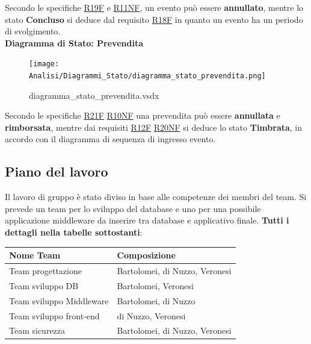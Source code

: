 \documentclass[a4paper]{article}
\begin{document}
Secondo le specifiche \hyperlink{R19F}{R19F} e \hyperlink{R11NF}{R11NF}, un evento può essere \textbf{annullato}, mentre lo stato \textbf{Concluso} si deduce dal requisito \hyperlink{R18F}{R18F} in quanto un evento ha un periodo di svolgimento.\\

\textbf{Diagramma di Stato: Prevendita}

\begin{figure}[H]
    \texttt{[image: Analisi/Diagrammi\_Stato/diagramma\_stato\_prevendita.png]}
    \centering
    \caption{diagramma\_stato\_prevendita.vsdx}
\end{figure}

Secondo le specifiche \hyperlink{R21F}{R21F} \hyperlink{R10NF}{R10NF} una prevendita può essere \textbf{annullata} e \textbf{rimborsata}, mentre dai requisiti \hyperlink{R12F}{R12F} \hyperlink{R20NF}{R20NF} si deduce lo stato \textbf{Timbrata}, in accordo con il diagramma di sequenza di ingresso evento.

\newpage

\subsection{Piano del lavoro}

Il lavoro di gruppo è stato diviso in base alle competenze dei membri del team. Si prevede un team per lo sviluppo del database e uno per una possibile applicazione middleware da inserire tra database e applicativo finale. \textbf{Tutti i dettagli nella tabelle sottostanti}:

\begin{center}
    \begin{tabularx}{1\textwidth}{|X|X|}
        \hline
        \textbf{Nome Team} & \textbf{Composizione}\\
        \hline
        \hline
        Team progettazione & Bartolomei, di Nuzzo, Veronesi\\
        \hline
        Team sviluppo DB & Bartolomei, Veronesi\\
        \hline
        Team sviluppo Middleware & Bartolomei, di Nuzzo\\
        \hline
        Team sviluppo front-end & di Nuzzo, Veronesi\\
        \hline
        Team sicurezza & Bartolomei, di Nuzzo, Veronesi\\
        \hline
    \end{tabularx}
\end{center}
\end{document}
